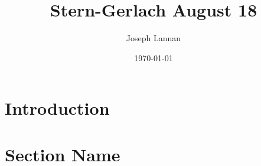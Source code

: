 \documentclass{article}
\title{Stern-Gerlach August 18}
\author{Joseph Lannan}
\date{\today}
\begin{document}
 
\maketitle
 
\section{Introduction}

\section{Section Name}
 
\end{document}
